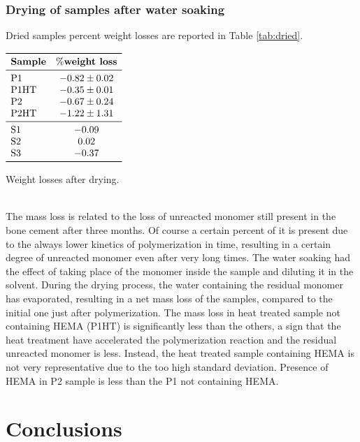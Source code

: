\documentclass[a4paper, 11pt]{article}
\begin{document}
\subsubsection{Drying of samples after water soaking}

Dried samples percent weight losses are reported in Table \ref{tab:dried}. 
\begin{table}[htp]
\centering
$
\begin{array}{lc}
\toprule
\textbf{Sample} & \textbf{$\%$weight loss}  \\
\midrule
\text{P1} & -0.82 \pm0.02 \\
\text{P1HT} & -0.35\pm0.01 \\
\text{P2} & -0.67\pm0.24 \\
\text{P2HT} & -1.22\pm1.31 \\
\midrule
\text{S1} & -0.09 \\
\text{S2} & 0.02 \\
\text{S3} & -0.37 \\
\bottomrule
\end{array}
$
\caption{Weight losses after drying.}
\label{tab:dried}
\end{table}\\
The mass loss is related to the loss of unreacted monomer still present in the bone cement after three months. Of course a certain percent of it is present due to the always lower kinetics of polymerization in time, resulting in a certain degree of unreacted monomer even after very long times. The water soaking had the effect of taking place of the monomer inside the sample and diluting it in the solvent. During the drying process, the water containing the residual monomer has evaporated, resulting in a net mass loss of the samples, compared to the initial one just after polymerization. 
The mass loss in heat treated sample not containing HEMA (P1HT) is significantly less than the others, a sign that the heat treatment have accelerated the polymerization reaction and the residual unreacted monomer is less. Instead, the heat treated sample containing HEMA is not very representative due to the too high standard deviation. Presence of HEMA in P2 sample is less than the P1 not containing HEMA. 

\section{Conclusions}
\end{document}
